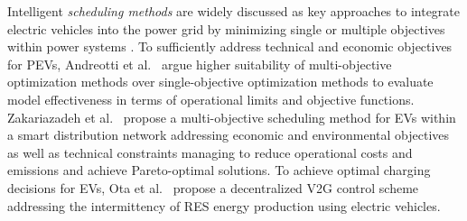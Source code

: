 %


Intelligent \textit{scheduling methods} are widely discussed as key approaches to integrate electric vehicles into the power grid by minimizing single or multiple objectives within power systems \cite{yang2015computational}.
To sufficiently address technical and economic objectives for PEVs, Andreotti et al.~\cite{andreotti2012review} argue higher suitability of multi-objective optimization methods over single-objective optimization methods to evaluate model effectiveness in terms of operational limits and objective functions. 
Zakariazadeh et al.~\cite{zakariazadeh2014multi} propose a multi-objective scheduling method for EVs within a smart distribution network addressing economic and environmental objectives as well as technical constraints managing to reduce operational costs and emissions and achieve Pareto-optimal solutions.
To achieve optimal charging decisions for EVs, Ota et al.~\cite{ota2012autonomous} propose a decentralized V2G control scheme addressing the intermittency of RES energy production using electric vehicles. 

